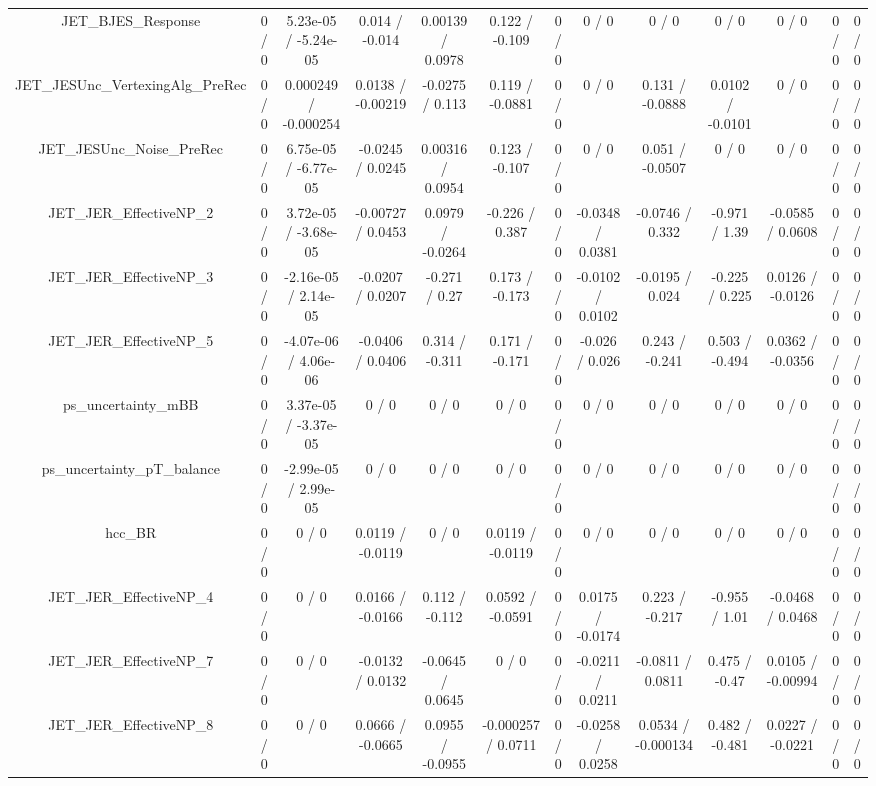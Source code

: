 \documentclass[10pt]{article}
\begin{document}
\begin{table}[htbp]
\begin{center}
\begin{tabular}{|c|c|c|c|c|c|c|c|c|c|c|c|c|}
  JET_BJES_Response & 0 / 0 & 5.23e-05 / -5.24e-05 & 0.014 / -0.014 & 0.00139 / 0.0978 & 0.122 / -0.109 & 0 / 0 & 0 / 0 & 0 / 0 & 0 / 0 & 0 / 0 & 0 / 0 & 0 / 0 \\ 
  JET_JESUnc_VertexingAlg_PreRec & 0 / 0 & 0.000249 / -0.000254 & 0.0138 / -0.00219 & -0.0275 / 0.113 & 0.119 / -0.0881 & 0 / 0 & 0 / 0 & 0.131 / -0.0888 & 0.0102 / -0.0101 & 0 / 0 & 0 / 0 & 0 / 0 \\ 
  JET_JESUnc_Noise_PreRec & 0 / 0 & 6.75e-05 / -6.77e-05 & -0.0245 / 0.0245 & 0.00316 / 0.0954 & 0.123 / -0.107 & 0 / 0 & 0 / 0 & 0.051 / -0.0507 & 0 / 0 & 0 / 0 & 0 / 0 & 0 / 0 \\ 
  JET_JER_EffectiveNP_2 & 0 / 0 & 3.72e-05 / -3.68e-05 & -0.00727 / 0.0453 & 0.0979 / -0.0264 & -0.226 / 0.387 & 0 / 0 & -0.0348 / 0.0381 & -0.0746 / 0.332 & -0.971 / 1.39 & -0.0585 / 0.0608 & 0 / 0 & 0 / 0 \\ 
  JET_JER_EffectiveNP_3 & 0 / 0 & -2.16e-05 / 2.14e-05 & -0.0207 / 0.0207 & -0.271 / 0.27 & 0.173 / -0.173 & 0 / 0 & -0.0102 / 0.0102 & -0.0195 / 0.024 & -0.225 / 0.225 & 0.0126 / -0.0126 & 0 / 0 & 0 / 0 \\ 
  JET_JER_EffectiveNP_5 & 0 / 0 & -4.07e-06 / 4.06e-06 & -0.0406 / 0.0406 & 0.314 / -0.311 & 0.171 / -0.171 & 0 / 0 & -0.026 / 0.026 & 0.243 / -0.241 & 0.503 / -0.494 & 0.0362 / -0.0356 & 0 / 0 & 0 / 0 \\ 
  ps_uncertainty_mBB & 0 / 0 & 3.37e-05 / -3.37e-05 & 0 / 0 & 0 / 0 & 0 / 0 & 0 / 0 & 0 / 0 & 0 / 0 & 0 / 0 & 0 / 0 & 0 / 0 & 0 / 0 \\ 
  ps_uncertainty_pT_balance & 0 / 0 & -2.99e-05 / 2.99e-05 & 0 / 0 & 0 / 0 & 0 / 0 & 0 / 0 & 0 / 0 & 0 / 0 & 0 / 0 & 0 / 0 & 0 / 0 & 0 / 0 \\ 
  hcc_BR & 0 / 0 & 0 / 0 & 0.0119 / -0.0119 & 0 / 0 & 0.0119 / -0.0119 & 0 / 0 & 0 / 0 & 0 / 0 & 0 / 0 & 0 / 0 & 0 / 0 & 0 / 0 \\ 
  JET_JER_EffectiveNP_4 & 0 / 0 & 0 / 0 & 0.0166 / -0.0166 & 0.112 / -0.112 & 0.0592 / -0.0591 & 0 / 0 & 0.0175 / -0.0174 & 0.223 / -0.217 & -0.955 / 1.01 & -0.0468 / 0.0468 & 0 / 0 & 0 / 0 \\ 
  JET_JER_EffectiveNP_7 & 0 / 0 & 0 / 0 & -0.0132 / 0.0132 & -0.0645 / 0.0645 & 0 / 0 & 0 / 0 & -0.0211 / 0.0211 & -0.0811 / 0.0811 & 0.475 / -0.47 & 0.0105 / -0.00994 & 0 / 0 & 0 / 0 \\ 
  JET_JER_EffectiveNP_8 & 0 / 0 & 0 / 0 & 0.0666 / -0.0665 & 0.0955 / -0.0955 & -0.000257 / 0.0711 & 0 / 0 & -0.0258 / 0.0258 & 0.0534 / -0.000134 & 0.482 / -0.481 & 0.0227 / -0.0221 & 0 / 0 & 0 / 0 \\ 

\end{tabular}
\end{center}
\end{table}
\end{document}
